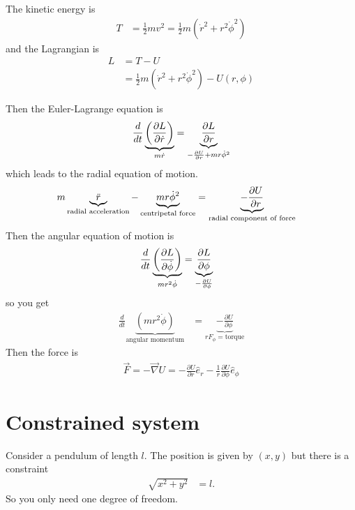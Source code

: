 \begin{example}
    The kinetic energy is
    \begin{align}
        T &= \frac{1}{2}mv^2 =
        \frac{1}{2} m\left( \dot{r}^2 + r^2 \dot{\phi}^2 \right)
    \end{align}
    and the Lagrangian is
    \begin{align}
        L &= T - U\\
        &=
        \frac{1}{2}m\left( \dot{r}^2 + r^2\dot{\phi}^2 \right)
        - U(r, \phi)
    \end{align}
\end{example}
Then the Euler-Lagrange equation is
\begin{align}
    \frac{d}{dt}
    \underbrace{%
        \left(
            \frac{\partial L}{\partial\dot{r}}
        \right)
    }_{%
        m\dot{r}
    }
    =
    \underbrace{%
        \frac{\partial L}{\partial r}
    }_{%
        -\frac{\partial U}{\partial r} + mr\dot{\phi}^2
    }
\end{align}
which leads to the radial equation of motion.
\begin{align}
    m\underbrace{\ddot{r}}_{\text{radial acceleration}}
    - \underbrace{m r\dot{\phi}^2}_{\text{centripetal force}}
    &=
    \underbrace{- \frac{\partial U}{\partial r}}_{%
        \text{radial component of force}
    }
\end{align}
Then the angular equation of motion is
\begin{align}
    \frac{d}{dt}\underbrace{%
        \left(
            \frac{\partial L}{\partial\dot{\phi}}
        \right)
    }_{mr^2\dot{\phi}}
    &=
    \underbrace{\frac{\partial L}{\partial \phi}}_{
        -\frac{\partial U}{\partial \phi}
    }
\end{align}
so you get
\begin{align}
    \frac{d}{dt}\underbrace{\left( mr^2\dot{\phi} \right)}_{\text{angular
    momentum}}
    &=
    \underbrace{- \frac{\partial U}{\partial \phi}}_{r F_{\phi}=\text{torque}}
\end{align}
Then the force is
\begin{align}
    \vec{F} = - \vec{\nabla} U
    = -\frac{\partial U}{\partial r} \hat{e}_r
    - \frac{1}{r} \frac{\partial U}{\partial \phi} \hat{e}_\phi
\end{align}

\section{Constrained system}
Consider a pendulum of length $l$.
The position is given by $(x,y)$
but there is a constraint
\begin{align}
    \sqrt{x^2 + y^2} &= l.
\end{align}
So you only need one degree of freedom.

